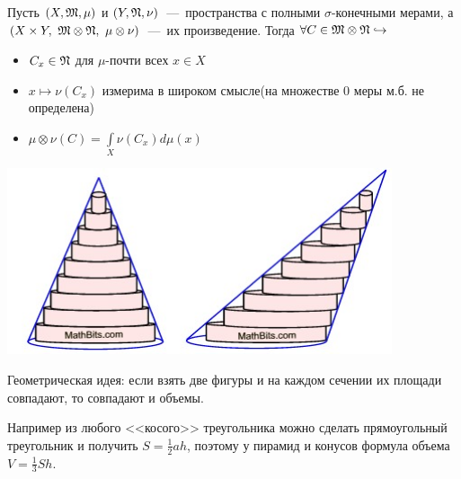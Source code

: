 \begin{theorem}
    Пусть $(X, \mathfrak{M}, \mu)$ и $(Y, \mathfrak{N}, \nu)$~---~пространства с полными $\sigma$-конечными мерами, а $(X \times Y, \ \MM \otimes \NN, \ \mu \otimes \nu)$~---~их произведение. Тогда $\forall C \in \mathfrak{M} \otimes \mathfrak{N} \hookrightarrow$
    \begin{itemize}
        \item $C_x \in \mathfrak{N}$ для $\mu$-почти всех $x \in X$
        \item $x \mapsto \nu(C_x)$ измерима в широком смысле(на множестве 0 меры м.б. не определена)
        \item $\mu\otimes\nu(C) = \int\limits_X \nu(C_x)d\mu(x)$
    \end{itemize}


\begin{minipage}{0.5\textwidth}%
    \includegraphics[width=0.85\textwidth]{images/Cavalery.jpg} 
\end{minipage}%
\hfill
\begin{minipage}{0.5\textwidth}\RaggedRight
Геометрическая идея: если взять две фигуры и на каждом сечении их площади совпадают, то совпадают и объемы.

Например из любого <<косого>> треугольника можно сделать прямоугольный треугольник и получить $S = \frac{1}{2}ah$, поэтому у пирамид и конусов формула объема $V = \frac{1}{3}Sh$.
\end{minipage}

    
\end{theorem}
